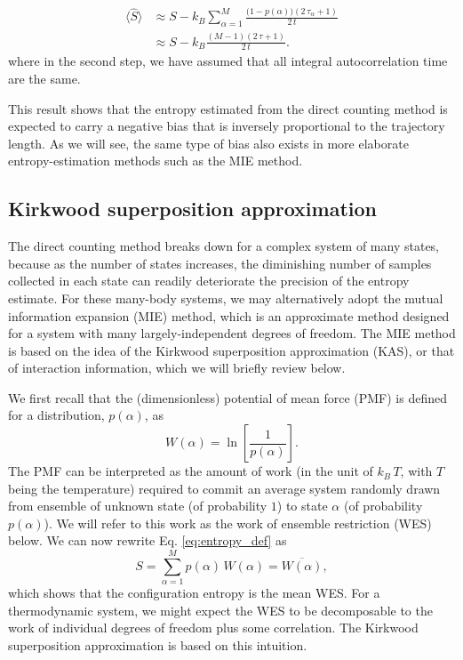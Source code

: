 \documentclass[preprint, superscriptaddress]{revtex4-1}
\begin{document}
\begin{align*}
  \langle \hat S \rangle
  &\approx
  S - k_B \sum_{\alpha = 1}^M
    \frac{ \bigl(1 - p(\alpha)\bigr) ( 2 \, \tau_\alpha + 1) } { 2 \, t }
  \\
  &\approx
  S - k_B
    \frac{ (M - 1) ( 2 \, \tau + 1) } { 2 \, t }
  .
\end{align*}
where in the second step,
we have assumed that all integral autocorrelation time are the same.

This result shows that the entropy estimated
from the direct counting method
is expected to carry a negative bias
that is inversely proportional to the trajectory length.
%
As we will see, the same type of bias also exists
in more elaborate entropy-estimation methods
such as the MIE method.


\subsection{Kirkwood superposition approximation}


The direct counting method breaks down
for a complex system of many states,
because as the number of states increases,
the diminishing number of samples collected in each state
can readily deteriorate the precision of the entropy estimate.
%
For these many-body systems,
we may alternatively adopt
the mutual information expansion (MIE) method,
which is an approximate method designed for a system
with many largely-independent degrees of freedom.
%
The MIE method is based on the idea of
the Kirkwood superposition approximation (KAS)\cite{kirkwood1935},
or that of interaction information\cite{mcgill1954},
which we will briefly review below.

We first recall that the (dimensionless) potential of mean force (PMF)
is defined for a distribution, $p(\alpha)$,
as
$$
W(\alpha) = \ln\left[ \frac{1}{p(\alpha)} \right].
$$
The PMF can be interpreted as the amount of work
(in the unit of $k_B \, T$, with $T$ being the temperature)
required to commit an average system randomly drawn from ensemble of unknown state (of probability $1$)
to state $\alpha$ (of probability $p(\alpha)$).
%
We will refer to this work as the work of ensemble restriction (WES) below.
%
We can now rewrite Eq. \eqref{eq:entropy_def} as
%
\begin{equation}
  S =
  \sum_{\alpha = 1}^M p(\alpha) \, W(\alpha)
  =
  \overline{ W(\alpha) }
  ,
\end{equation}
%
which shows that the configuration entropy
is the mean WES.
%
For a thermodynamic system,
we might expect the WES to be decomposable to
the work of individual degrees of freedom plus some correlation.
%
The Kirkwood superposition approximation is based on this intuition.
\end{document}
